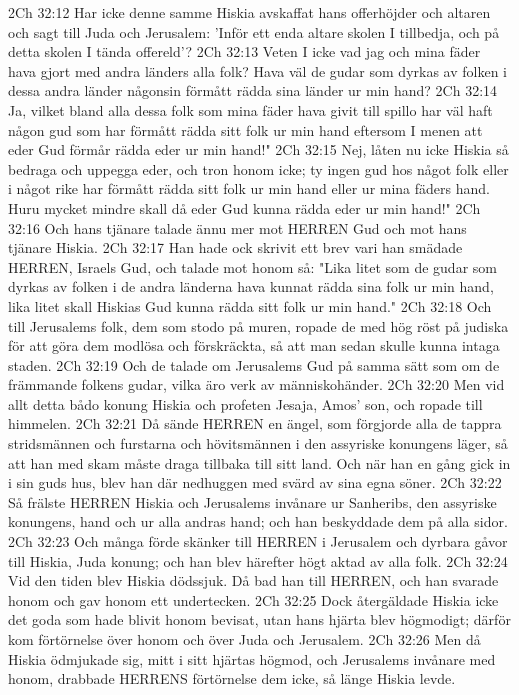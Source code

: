 2Ch 32:12  Har icke denne samme Hiskia avskaffat hans offerhöjder och altaren och sagt till Juda och Jerusalem: 'Inför ett enda altare skolen I tillbedja, och på detta skolen I tända offereld'?
2Ch 32:13  Veten I icke vad jag och mina fäder hava gjort med andra länders alla folk? Hava väl de gudar som dyrkas av folken i dessa andra länder någonsin förmått rädda sina länder ur min hand?
2Ch 32:14  Ja, vilket bland alla dessa folk som mina fäder hava givit till spillo har väl haft någon gud som har förmått rädda sitt folk ur min hand eftersom I menen att eder Gud förmår rädda eder ur min hand!"
2Ch 32:15  Nej, låten nu icke Hiskia så bedraga och uppegga eder, och tron honom icke; ty ingen gud hos något folk eller i något rike har förmått rädda sitt folk ur min hand eller ur mina fäders hand. Huru mycket mindre skall då eder Gud kunna rädda eder ur min hand!"
2Ch 32:16  Och hans tjänare talade ännu mer mot HERREN Gud och mot hans tjänare Hiskia.
2Ch 32:17  Han hade ock skrivit ett brev vari han smädade HERREN, Israels Gud, och talade mot honom så: "Lika litet som de gudar som dyrkas av folken i de andra länderna hava kunnat rädda sina folk ur min hand, lika litet skall Hiskias Gud kunna rädda sitt folk ur min hand."
2Ch 32:18  Och till Jerusalems folk, dem som stodo på muren, ropade de med hög röst på judiska för att göra dem modlösa och förskräckta, så att man sedan skulle kunna intaga staden.
2Ch 32:19  Och de talade om Jerusalems Gud på samma sätt som om de främmande folkens gudar, vilka äro verk av människohänder.
2Ch 32:20  Men vid allt detta bådo konung Hiskia och profeten Jesaja, Amos' son, och ropade till himmelen.
2Ch 32:21  Då sände HERREN en ängel, som förgjorde alla de tappra stridsmännen och furstarna och hövitsmännen i den assyriske konungens läger, så att han med skam måste draga tillbaka till sitt land. Och när han en gång gick in i sin guds hus, blev han där nedhuggen med svärd av sina egna söner.
2Ch 32:22  Så frälste HERREN Hiskia och Jerusalems invånare ur Sanheribs, den assyriske konungens, hand och ur alla andras hand; och han beskyddade dem på alla sidor.
2Ch 32:23  Och många förde skänker till HERREN i Jerusalem och dyrbara gåvor till Hiskia, Juda konung; och han blev härefter högt aktad av alla folk.
2Ch 32:24  Vid den tiden blev Hiskia dödssjuk. Då bad han till HERREN, och han svarade honom och gav honom ett undertecken.
2Ch 32:25  Dock återgäldade Hiskia icke det goda som hade blivit honom bevisat, utan hans hjärta blev högmodigt; därför kom förtörnelse över honom och över Juda och Jerusalem.
2Ch 32:26  Men då Hiskia ödmjukade sig, mitt i sitt hjärtas högmod, och Jerusalems invånare med honom, drabbade HERRENS förtörnelse dem icke, så länge Hiskia levde.
